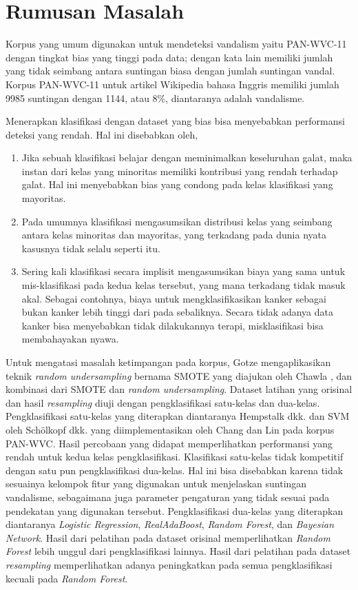 \section{Rumusan Masalah}\label{sec:rumusan-masalah}

Korpus yang umum digunakan untuk mendeteksi vandalism yaitu PAN-WVC-11 dengan tingkat bias yang tinggi pada data; dengan kata lain memiliki jumlah yang tidak seimbang antara suntingan biasa dengan jumlah suntingan vandal.
Korpus PAN-WVC-11 untuk artikel Wikipedia bahasa Inggris memiliki jumlah 9985 suntingan dengan 1144, atau 8\%, diantaranya adalah vandalisme.

Menerapkan klasifikasi dengan dataset yang bias bisa menyebabkan performansi deteksi yang rendah.
Hal ini disebabkan oleh,
\begin{enumerate}
	\item Jika sebuah klasifikasi belajar dengan meminimalkan keseluruhan galat, maka instan dari kelas yang minoritas memiliki kontribusi yang rendah terhadap galat.
Hal ini menyebabkan bias yang condong pada kelas klasifikasi yang mayoritas.
	\item Pada umumnya klasifikasi mengasumsikan distribusi kelas yang seimbang antara kelas minoritas dan mayoritas, yang terkadang pada dunia nyata kasusnya tidak selalu seperti itu.
	\item Sering kali klasifikasi secara implisit mengasumsikan biaya yang sama untuk mis-klasifikasi pada kedua kelas tersebut, yang mana terkadang tidak masuk akal.
Sebagai contohnya, biaya untuk mengklasifikasikan kanker sebagai bukan kanker lebih tinggi dari pada sebaliknya.
Secara tidak adanya data kanker bisa menyebabkan tidak dilakukannya terapi, misklasifikasi bisa membahayakan nyawa.
\end{enumerate}

Untuk mengatasi masalah ketimpangan pada korpus, Gotze \cite{gotze2014advanced} mengaplikasikan teknik \textit{random undersampling} bernama SMOTE yang diajukan oleh Chawla \cite{chawla2002smote}, dan kombinasi dari SMOTE dan \textit{random undersampling}.
Dataset latihan yang orisinal dan hasil \textit{resampling} diuji dengan pengklasifikasi satu-kelas dan dua-kelas.
Pengklasifikasi satu-kelas yang diterapkan diantaranya Hempstalk dkk. \cite{hempstalk2008one} dan SVM oleh Schölkopf dkk. \cite{scholkopf1999support} yang diimplementasikan oleh Chang dan Lin \cite{chang2011libsvm} pada korpus PAN-WVC.
Hasil percobaan yang didapat memperlihatkan performansi yang rendah untuk kedua kelas pengklasifikasi. Klasifikasi satu-kelas tidak kompetitif dengan satu pun pengklasifikasi dua-kelas.
Hal ini bisa disebabkan karena tidak sesuainya kelompok fitur yang digunakan untuk menjelaskan suntingan vandalisme, sebagaimana juga parameter pengaturan yang tidak sesuai pada pendekatan yang digunakan tersebut.
Pengklasifikasi dua-kelas yang diterapkan diantaranya \textit{Logistic Regression}, \textit{RealAdaBoost}, \textit{Random Forest}, dan \textit{Bayesian Network}.
Hasil dari pelatihan pada dataset orisinal memperlihatkan \textit{Random Forest} lebih unggul dari pengklasifikasi lainnya.
Hasil dari pelatihan pada dataset \textit{resampling} memperlihatkan adanya peningkatkan pada semua pengklasifikasi kecuali pada \textit{Random Forest}.


